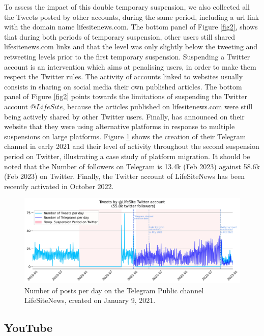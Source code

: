 \documentclass[Afour,sageh,times]{sagej}
\begin{document}
To assess the impact of this double temporary suspension, we also collected all the Tweets posted by other accounts, during the same period, including a url link with the domain name lifesitenews.com. 
The bottom panel of Figure \ref{fig2}, shows that during both periods of temporary suspension, other users still shared lifesitenews.com links and that the level was only slightly below the tweeting and retweeting levels prior to the first temporary suspension.
Suspending a Twitter account is an intervention which aims at penalising users, in order to make them respect the Twitter rules.  The activity of accounts linked to websites usually consists in sharing on social media their own published articles. 
The bottom panel of Figure \ref{fig2} points towards the limitations of suspending the Twitter account $@LifeSite$, because the 
articles published on lifesitenews.com were still being actively shared by other Twitter users. 
Finally, \cite{LifeSiteNews} has announced on their website that they were using alternative platforms in response to multiple suspensions on large platforms. 
Figure \ref{telegram} shows the creation of their Telegram channel in early 2021 and their level of activity throughout the second suspension period on Twitter, illustrating a case study of platform migration. 
It should be noted that the Number of followers on Telegram is 13.4k (Feb 2023) against 58.6k (Feb 2023) on Twitter. 
Finally, the Twitter account of LifeSiteNews has been recently activated in October 2022. 
\begin{figure}[h]
\includegraphics[scale=0.34]{../figure/lifesite_2022_01_04.jpg} 
\caption{Number of posts per day on the Telegram Public channel LifeSiteNews, created on January 9, 2021. }
\label{telegram}
\end{figure}

\subsection{YouTube}
\end{document}
